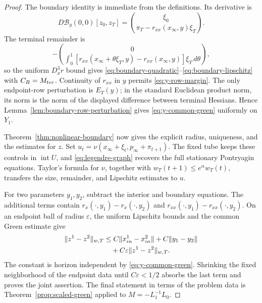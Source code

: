 \documentclass[twocolumn,nameyear,amsthm]{autart}
\newcommand{\B}{\mathcal B}
\newcommand{\xinf}{x_\infty}
\newcommand{\pinf}{p_\infty}
\numberwithin{equation}{section}
\begin{document}
\begin{proof}
The boundary identity is immediate from the definitions.  Its derivative is
\[
 D\B_y(0,0)[z_0,z_T]
 =\binom{\xi_0}{\pi_T-r_{xx}(\xinf,y)\xi_T}.
\]
The terminal remainder is
\[
 -\binom0{\displaystyle
 \int_0^1[r_{xx}(\xinf+\theta\xi_T,y)-r_{xx}(\xinf,y)]
 \xi_T\,d\theta},
\]
so the uniform $D_x^3r$ bound gives
\eqref{eq:boundary-quadratic}--\eqref{eq:boundary-lipschitz} with
$C_B=M_{\rm ter}$.  Continuity of $r_{xx}$ in $y$ permits
\eqref{eq:y-row-margin}.  The only endpoint-row perturbation is $E_T(y)$; in
the standard Euclidean product norm, its norm is the norm of the displayed
difference between terminal Hessians.  Hence
Lemma~\ref{lem:boundary-row-perturbation} gives
\eqref{eq:y-common-green} uniformly on $Y_1$.

Theorem~\ref{thm:nonlinear-boundary} now gives the explicit radius, uniqueness,
and the estimates for $z$.  Set
$u_t=\nu(\xinf+\xi_t,\pinf+\pi_{t+1})$.  The fixed tube keeps these controls
in $\operatorname{int}U$, and \eqref{eq:legendre-graph} recovers the full
stationary Pontryagin equations.  Taylor's formula for $\nu$, together with
$w_T(t+1)\le e^\alpha w_T(t)$, transfers the size, remainder, and Lipschitz
estimates to $u$.

For two parameters $y_1,y_2$, subtract the interior and boundary equations.
The additional terms contain
$r_x(\cdot,y_1)-r_x(\cdot,y_2)$ and
$r_{xx}(\cdot,y_1)-r_{xx}(\cdot,y_2)$.  On an endpoint ball of radius
$\varepsilon$, the uniform Lipschitz bounds and the common Green estimate give
\begin{equation}\label{eq:joint-y-absorption}
 \begin{aligned}
 \|z^1-z^2\|_{w,T}
 &\le C\|x_{\rm in}^1-x_{\rm in}^2\|+C\|y_1-y_2\|\\
 &\quad{}+C\varepsilon\|z^1-z^2\|_{w,T}.
 \end{aligned}
\end{equation}
The constant is horizon independent by \eqref{eq:y-common-green}.  Shrinking
the fixed neighborhood of the endpoint data until $C\varepsilon<1/2$ absorbs the
last term and proves the joint assertion.  The final statement in terms of the problem data is
Theorem~\ref{prop:scaled-green} applied to
$M=-L_1^{-1}L_0$.
\end{proof}
\end{document}
